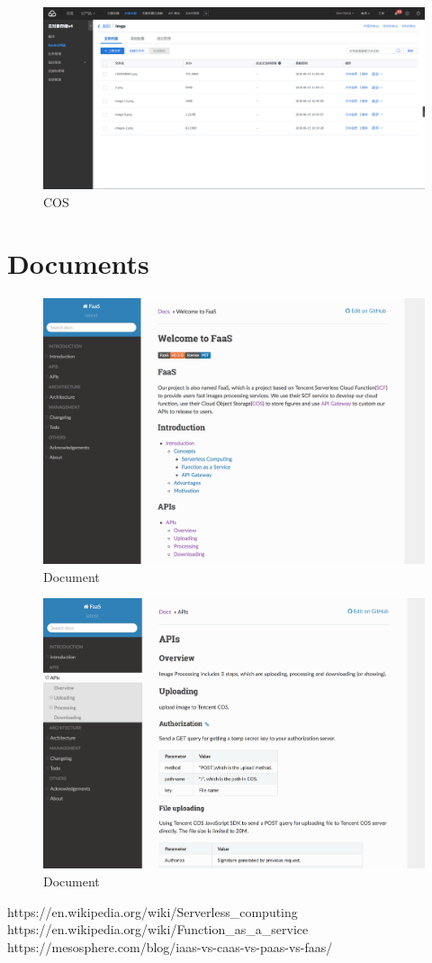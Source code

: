 \documentclass[a4paper,12pt]{article}
\begin{document}
\begin{figure}[H]
\centering
\includegraphics[scale=0.21]{figures/COS2.png}
\caption{\label{fig:cos2}COS}
\end{figure}

\section{Documents}
\begin{figure}[H]
\centering
\includegraphics[scale=0.36]{figures/docs1.png}
\caption{\label{fig:docs1}Document}
\end{figure}

\begin{figure}[H]
\centering
\includegraphics[scale=0.36]{figures/docs2.png}
\caption{\label{fig:docs2}Document}
\end{figure}

\begin{thebibliography}{1}
https://en.wikipedia.org/wiki/Serverless\_computing
https://en.wikipedia.org/wiki/Function\_as\_a\_service
https://mesosphere.com/blog/iaas-vs-caas-vs-paas-vs-faas/

\end{thebibliography}
\end{document}
